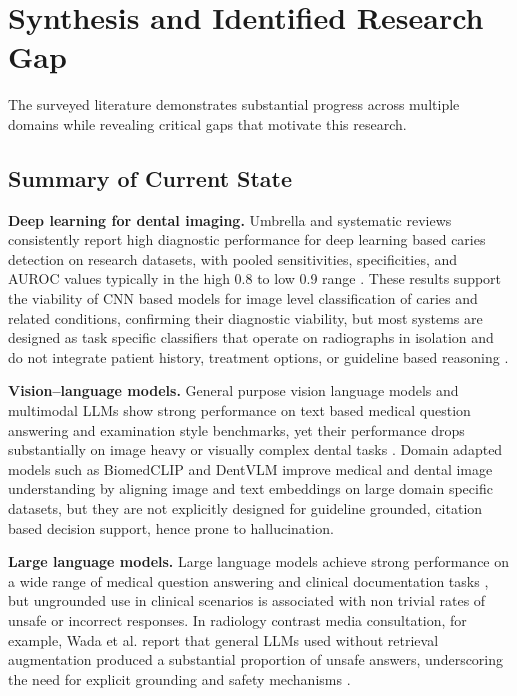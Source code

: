 \documentclass[12pt,a4paper]{report}
\begin{document}
	
	\section{Synthesis and Identified Research Gap}
	\label{sec:gap}
	
	The surveyed literature demonstrates substantial progress across multiple
	domains while revealing critical gaps that motivate this research.
	
	\subsection{Summary of Current State}
	
	\textbf{Deep learning for dental imaging.}
	Umbrella and systematic reviews consistently report high diagnostic performance
	for deep learning based caries detection on research datasets, with pooled
	sensitivities, specificities, and AUROC values typically in the high 0.8 to
	low 0.9 range \cite{Dashti2024DLCariesUmbrella,Arzani2025AICariesUmbrella}.
	These results support the viability of CNN based models for image level
	classification of caries and related conditions, confirming their diagnostic viability, but most systems are designed
	as task specific classifiers that operate on radiographs in isolation and do
	not integrate patient history, treatment options, or guideline based reasoning
	\cite{putra2021ai_dental_radiography,inchingolo2025ai_dentistry_review}.
	
	\textbf{Vision--language models.}
	General purpose vision language models and multimodal LLMs show strong
	performance on text based medical question answering and examination style
	benchmarks, yet their performance drops substantially on image heavy or visually
	complex dental tasks \cite{mine2025benchmarking_multimodal_llms_dental}. Domain adapted
	models such as BiomedCLIP \cite{zhang2023biomedclip} and DentVLM \cite{meng2025dentvlm}
	improve medical and dental image understanding by aligning image and text
	embeddings on large domain specific datasets, but they are not explicitly
	designed for guideline grounded, citation based decision support, hence prone to hallucination.
	
	\textbf{Large language models.}
	Large language models achieve strong performance on a wide range of medical
	question answering and clinical documentation tasks
	\cite{thirunavukarasu2023large}, but ungrounded use in clinical scenarios is
	associated with non trivial rates of unsafe or incorrect responses. In radiology
	contrast media consultation, for example, Wada et al.\cite{Wada2025RAGRadiology} report that general LLMs
	used without retrieval augmentation produced a substantial proportion of unsafe
	answers, underscoring the need for explicit grounding and safety mechanisms
	\cite{Wada2025RAGRadiology}.
	
\end{document}
